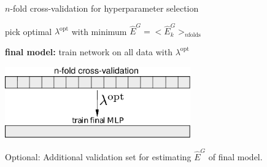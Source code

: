 \begin{frame}
	\begin{block}{$n$-fold cross-validation for hyperparameter selection}
		\vspace{2mm}

		pick optimal $\lambda^{\text{opt}}$ with minimum $\widehat{E}^G=\big<\widehat{E}^G_{k}\big>_{n \text{folds}}$\\
		\vspace{2mm}

		\textbf{final model:} train network on all data with $\lambda^{\text{opt}}$ 
	\end{block}
	
	\vspace{2mm}
	\begin{center}
		\includegraphics[width=8cm]{img/nfoldcrossvalidation.pdf} 
	\end{center}
	Optional: Additional validation set for estimating $\widehat{E}^G$ of final model.
\end{frame}

